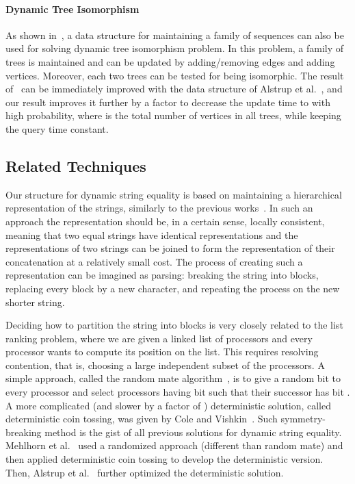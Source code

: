 \documentclass[a4paper]{article}
\theoremstyle{remark}
\begin{document}
\paragraph{Dynamic Tree Isomorphism}
As shown in~\cite{treei}, a data structure for maintaining a family of sequences can also be used for solving dynamic tree isomorphism problem.
In this problem, a family of trees is maintained and can be updated by adding/removing edges and adding vertices.
Moreover, each two trees can be tested for being isomorphic.
The result of~\cite{treei} can be immediately improved with the data structure of
Alstrup et al.~\cite{Alstrup}, and our result improves it further by a  factor
to decrease the update time to  with high probability, where  is the total number of vertices in all trees, while keeping the query time constant.

\subsection{Related Techniques}
Our structure for dynamic string equality is based on maintaining a hierarchical representation
of the strings, similarly to the previous works~\cite{Mehlhorn,Alstrup}.
In such an approach the representation should be, in a certain sense, locally consistent, meaning that
two equal strings have identical representations and the representations of two strings
can be joined to form the representation of their concatenation at a relatively small cost.
The process of creating such a representation can be imagined as parsing: breaking the string into blocks,
replacing every block by a new character, and repeating the process on the new shorter
string.

Deciding how to partition the string into blocks is very closely related to the
list ranking problem, where we are given a linked list of  processors and every processor wants
to compute its position on the list. This requires resolving contention, that
is, choosing a large independent subset of the processors. A simple approach,
called the random mate algorithm~\cite{TreeContraction,Vishkin}, is to give a random bit
to every processor and select processors having bit  such that their successor has bit .
A more complicated (and slower by a factor of ) deterministic solution, called deterministic
coin tossing, was given by Cole and Vishkin~\cite{DeterministicTossing}. Such symmetry-breaking
method is the gist of all previous solutions for dynamic string equality. Mehlhorn et al.~\cite{Mehlhorn}
used a randomized approach (different than random mate) and then applied deterministic coin tossing
to develop the deterministic version. Then, Alstrup et al.~\cite{Alstrup} further optimized the
deterministic solution.
\end{document}
